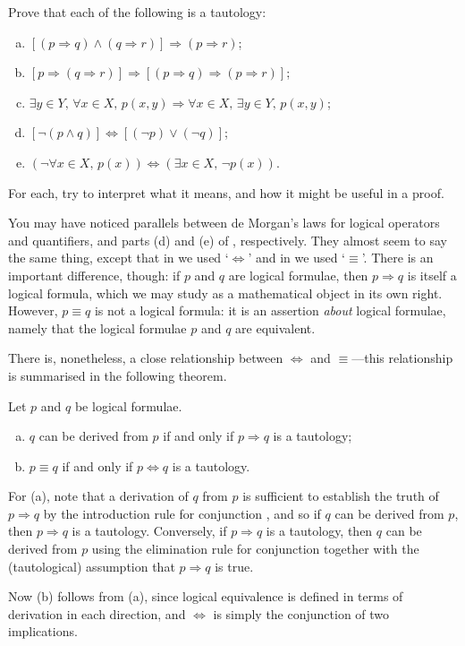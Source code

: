 \begin{exercise}
\label{exTautologies}
Prove that each of the following is a tautology:
\begin{enumerate}[(a)]
\item $[(p \Rightarrow q) \wedge (q \Rightarrow r)] \Rightarrow (p \Rightarrow r)$;
\item $[p \Rightarrow (q \Rightarrow r)] \Rightarrow [(p \Rightarrow q) \Rightarrow (p \Rightarrow r)]$;
\item $\exists y \in Y,\, \forall x \in X,\, p(x,y) \Rightarrow \forall x \in X,\, \exists y \in Y,\, p(x,y)$;
\item $[\neg (p \wedge q)] \Leftrightarrow [(\neg p) \vee (\neg q)]$;
\item $(\neg \forall x \in X,\, p(x)) \Leftrightarrow (\exists x \in X,\, \neg p(x))$.
\end{enumerate}
For each, try to interpret what it means, and how it might be useful in a proof.
\end{exercise}

You may have noticed parallels between de Morgan's laws for logical operators and quantifiers, and parts (d) and (e) of , respectively. They almost seem to say the same thing, except that in  we used `$\Leftrightarrow$' and in  we used `$\equiv$'. There is an important difference, though: if $p$ and $q$ are logical formulae, then $p \Rightarrow q$ is itself a logical formula, which we may study as a mathematical object in its own right. However, $p \equiv q$ is not a logical formula: it is an assertion \textit{about} logical formulae, namely that the logical formulae $p$ and $q$ are equivalent.

There is, nonetheless, a close relationship between $\Leftrightarrow$ and $\equiv$---this relationship is summarised in the following theorem.

\begin{theorem}
Let $p$ and $q$ be logical formulae.
\begin{enumerate}[(a)]
\item $q$ can be derived from $p$ if and only if $p \Rightarrow q$ is a tautology;
\item $p \equiv q$ if and only if $p \Leftrightarrow q$ is a tautology.
\end{enumerate}
\end{theorem}

\begin{cproof}
For (a), note that a derivation of $q$ from $p$ is sufficient to establish the truth of $p \Rightarrow q$ by the introduction rule for conjunction \introrule{\Rightarrow}, and so if $q$ can be derived from $p$, then $p \Rightarrow q$ is a tautology. Conversely, if $p \Rightarrow q$ is a tautology, then $q$ can be derived from $p$ using the elimination rule for conjunction \elimrule{\Rightarrow} together with the (tautological) assumption that $p \Rightarrow q$ is true.

Now (b) follows from (a), since logical equivalence is defined in terms of derivation in each direction, and $\Leftrightarrow$ is simply the conjunction of two implications.
\end{cproof}

